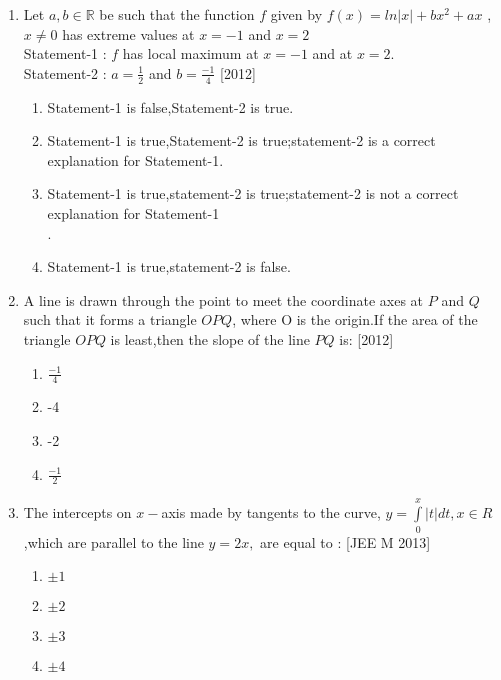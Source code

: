\documentclass[journal,12pt,twocolumn]{IEEEtran}
\theoremstyle{remark}
\begin{document}
\begin{enumerate}
\item Let $a,b\in \mathbb R$ be such that the function $f$ given by $f(x)=ln|x|+bx^{2}+ax$ , $x \neq 0$ has extreme values at $x=-1$ and $x=2$\\
Statement-1 : $f$ has local maximum at $x=-1$ and at $x=2$.\\
Statement-2 : $a=\frac{1}{2}$ and $b=\frac{-1}{4}$ \hfill{[2012]}\\
\begin{enumerate}
    \item Statement-1 is false,Statement-2 is true.\\
    \item Statement-1 is true,Statement-2 is true;statement-2 is a correct explanation for Statement-1.\\
    \item Statement-1 is true,statement-2 is true;statement-2 is not a correct explanation for Statement-1\\.
    \item Statement-1 is true,statement-2 is false.\\
\end{enumerate}

\item A line is drawn through the point to meet the coordinate axes at $P$ and $Q$ such that it forms a triangle $OPQ$, where O is the origin.If the area of the triangle $OPQ$ is least,then the slope of the line $PQ$ is: \hfill{[2012]}\\
\begin{enumerate}
    \item  $\frac{-1}{4}$\\
    \item  -4\\
    \item  -2\\
    \item  $\frac{-1}{2}$\\
\end{enumerate}
\item The intercepts on $x-$axis made by tangents to the curve, $y=\int\limits_0^x|t|dt,x\in R$,which are parallel to the line $y=2x,$ are equal to : {[JEE M 2013]}\\
\begin{enumerate}
    \item  $\pm1$\\
    \item  $\pm2$\\
    \item  $\pm3$\\
    \item  $\pm4$\\
    

\end{enumerate}
\end{enumerate}
\end{document}
